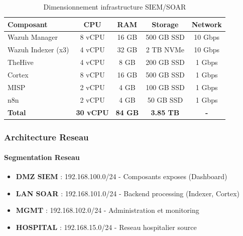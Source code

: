 \begin{table}[H]
    \centering
    \caption{Dimensionnement infrastructure SIEM/SOAR}
    \begin{tabular}{|l|c|c|c|c|}
        \hline
        \textbf{Composant} & \textbf{CPU}     & \textbf{RAM}   & \textbf{Storage} & \textbf{Network} \\
        \hline
        Wazuh Manager      & 8 vCPU           & 16 GB          & 500 GB SSD       & 10 Gbps          \\
        \hline
        Wazuh Indexer (x3) & 4 vCPU           & 32 GB          & 2 TB NVMe        & 10 Gbps          \\
        \hline
        TheHive            & 4 vCPU           & 8 GB           & 200 GB SSD       & 1 Gbps           \\
        \hline
        Cortex             & 8 vCPU           & 16 GB          & 500 GB SSD       & 1 Gbps           \\
        \hline
        MISP               & 2 vCPU           & 4 GB           & 100 GB SSD       & 1 Gbps           \\
        \hline
        n8n                & 2 vCPU           & 4 GB           & 50 GB SSD        & 1 Gbps           \\
        \hline
        \textbf{Total}     & \textbf{30 vCPU} & \textbf{84 GB} & \textbf{3.85 TB} & \textbf{-}       \\
        \hline
    \end{tabular}
\end{table}

\subsubsection{Architecture Reseau}

\paragraph{Segmentation Reseau}
\begin{itemize}
    \item \textbf{DMZ SIEM} : 192.168.100.0/24 - Composants exposes (Dashboard)
    \item \textbf{LAN SOAR} : 192.168.101.0/24 - Backend processing (Indexer, Cortex)
    \item \textbf{MGMT} : 192.168.102.0/24 - Administration et monitoring
    \item \textbf{HOSPITAL} : 192.168.15.0/24 - Reseau hospitalier source
\end{itemize}

